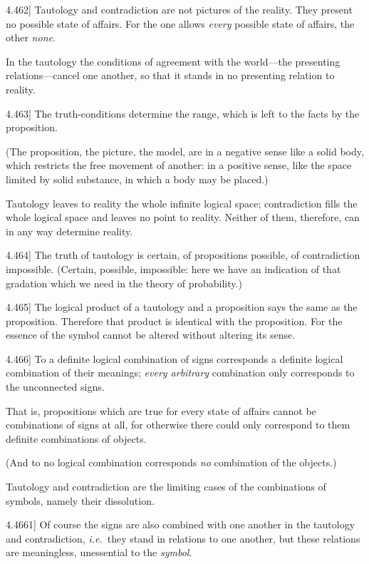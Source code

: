 \documentclass[12pt,oneside]{book}[2007/10/19]
\newcommand{\PropositionE}[2]{%
  \item[\phantomsection\label{PropE:#1}\PropGRef{#1}] #2%
}
\newcommand{\PropGRef}[1]{\hyperref[PropG:#1]{#1}}
\newcommand{\idEst}{\textit{i.e.}}
\newcommand{\AllowBreak}{\discretionary{}{}{}}
\begin{document}
\begin{propositions}
\PropositionE{4.462}
{Tautology and contradiction are not pictures of
the reality. They present no possible state of
affairs. For the one allows \emph{every} possible state
of affairs, the other \emph{none}.

In the tautology the conditions of agreement
with the world\AllowBreak---the presenting re\-la\-tions---cancel
one another, so that it stands in no presenting
relation to reality.}


\PropositionE{4.463}
{The truth-conditions determine the range, which
is left to the facts by the proposition.

(The proposition, the picture, the model, are in
a negative sense like a solid body, which restricts
the free movement of another: in a positive sense,
like the space limited by solid substance, in which
a body may be placed.)

Tautology leaves to reality the whole infinite
logical space; contradiction fills the whole logical
space and leaves no point to reality. Neither of
them, therefore, can in any way determine
reality.}


\PropositionE{4.464}
{The truth of tautology is certain, of propositions
possible, of contradiction impossible. (Certain,
possible, impossible: here we have an indication
of that gradation which we need in the theory of
probability.)}


\PropositionE{4.465}
{The logical product of a tautology and a proposition
says the same as the proposition. Therefore
that product is identical with the proposition.
For the essence of the symbol cannot be altered
without altering its sense.}


\PropositionE{4.466}
{To a definite logical combination of signs
corresponds a definite logical combination of their
meanings; \emph{every arbitrary} combination only corresponds
to the unconnected signs.

That is, propositions which are true for every
state of affairs cannot be combinations of signs at
all, for otherwise there could only correspond to
them definite combinations of objects.

(And to no logical combination corresponds \emph{no}
combination of the objects.)

Tautology and contradiction are the limiting
cases of the combinations of symbols, namely their
dissolution.}


\PropositionE{4.4661}
{Of course the signs are also combined with one
another in the tautology and contradiction, \idEst\ they
stand in relations to one another, but these
relations are meaningless, unessential to the
\emph{symbol}.}



\end{propositions}
\end{document}

